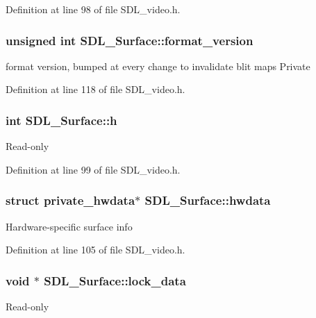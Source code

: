 Definition at line 98 of file S\+D\+L\+\_\+video.\+h.

\hypertarget{structSDL__Surface_a71e84e52b2faf69be9739f97b248342a}{
\subsubsection[{format\+\_\+version}]{\setlength{\rightskip}{0pt plus 5cm}unsigned int S\+D\+L\+\_\+\+Surface\+::format\+\_\+version}}\label{structSDL__Surface_a71e84e52b2faf69be9739f97b248342a}
format version, bumped at every change to invalidate blit maps Private 

Definition at line 118 of file S\+D\+L\+\_\+video.\+h.

\hypertarget{structSDL__Surface_af33bcf87a1f5e10a99b3c7e8626b38c8}{
\subsubsection[{h}]{\setlength{\rightskip}{0pt plus 5cm}int S\+D\+L\+\_\+\+Surface\+::h}}\label{structSDL__Surface_af33bcf87a1f5e10a99b3c7e8626b38c8}
Read-\/only 

Definition at line 99 of file S\+D\+L\+\_\+video.\+h.

\hypertarget{structSDL__Surface_a2d3ce688b6cfb72875f2411ea0560f18}{
\subsubsection[{hwdata}]{\setlength{\rightskip}{0pt plus 5cm}struct private\+\_\+hwdata$\ast$ S\+D\+L\+\_\+\+Surface\+::hwdata}}\label{structSDL__Surface_a2d3ce688b6cfb72875f2411ea0560f18}
Hardware-\/specific surface info 

Definition at line 105 of file S\+D\+L\+\_\+video.\+h.

\hypertarget{structSDL__Surface_a32de076726e96dafd4da1fd4f75cc2a8}{
\subsubsection[{lock\+\_\+data}]{\setlength{\rightskip}{0pt plus 5cm}void $\ast$ S\+D\+L\+\_\+\+Surface\+::lock\+\_\+data}}\label{structSDL__Surface_a32de076726e96dafd4da1fd4f75cc2a8}
Read-\/only 

